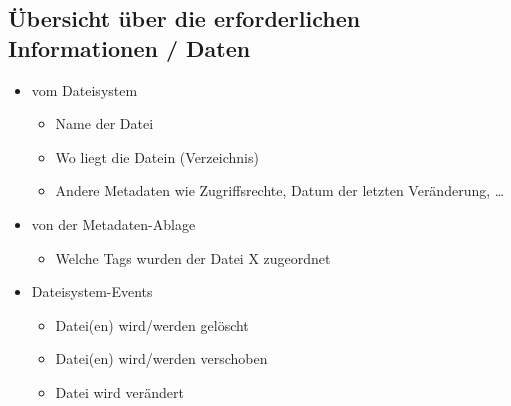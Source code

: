 \documentclass[10pt,paper=a4,final]{scrartcl}
\begin{document}
\subsection{\"Ubersicht \"uber die erforderlichen Informationen / Daten}
\begin{itemize}
  \item vom Dateisystem
    \begin{itemize}
      \item Name der Datei
      \item Wo liegt die Datein (Verzeichnis)
      \item Andere Metadaten wie Zugriffsrechte, Datum der letzten Ver\"anderung, \ldots
    \end{itemize}
  \item von der Metadaten-Ablage
    \begin{itemize}
      \item Welche Tags wurden der Datei X zugeordnet
    \end{itemize}
  \item Dateisystem-Events
    \begin{itemize}
      \item Datei(en) wird/werden gel\"oscht
      \item Datei(en) wird/werden verschoben
      \item Datei wird ver\"andert
    \end{itemize}
\end{itemize}
\end{document}
